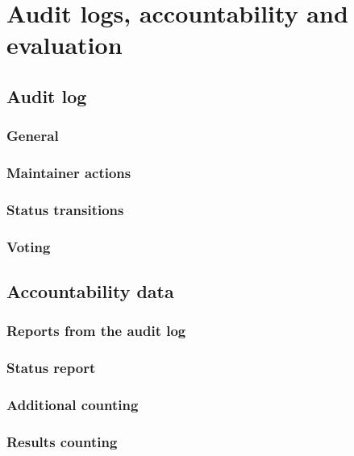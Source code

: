\chapter{Audit logs, accountability and evaluation}\label{cha:audit-logs-acco}

\section{Audit log}\label{sec8:audit-log}

\subsection{General}\label{sec8:general}

\subsection{Maintainer actions}\label{sec8:maintainer-actions}

\subsection{Status transitions}\label{sec8:status-transitions}

\subsection{Voting}\label{sec8:voting}

\section{Accountability data}\label{sec8:accountability-data}

\subsection{Reports from the audit log}\label{sec8:reports-from-audit}

\subsection{Status report}\label{sec8:status-report}

\subsection{Additional counting}\label{sec8:additional-counting}

\subsection{Results counting}\label{sec8:results-counting}

